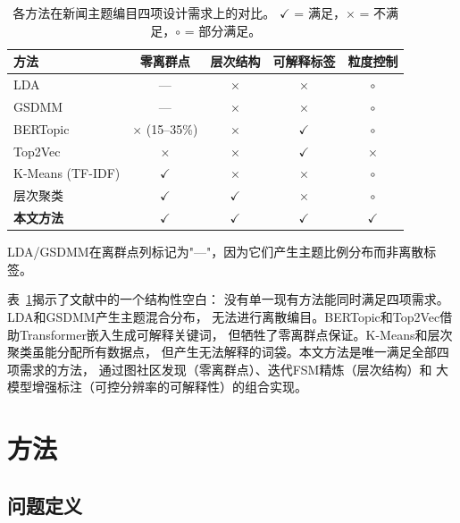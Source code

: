 \documentclass[10pt,twocolumn,twoside]{ctexart}
\begin{document}
\begin{table}[h]
\centering
\caption{各方法在新闻主题编目四项设计需求上的对比。
$\checkmark$ = 满足，$\times$ = 不满足，$\circ$ = 部分满足。}
\label{tab:method_requirement}
\small
\renewcommand{\arraystretch}{1.2}
\begin{tabular}{p{3.2cm}cccc}
\toprule
\textbf{方法} & \textbf{零离群点} & \textbf{层次结构} & \textbf{可解释标签} & \textbf{粒度控制} \\
\midrule
LDA~\cite{blei2003latent} 
    & --- & $\times$ & $\times$ & $\circ$ \\
GSDMM~\cite{yin2014gsdmm} 
    & --- & $\times$ & $\times$ & $\circ$ \\
BERTopic~\cite{grootendorst2022bertopic} 
    & $\times$ (15--35\%) & $\times$ & $\checkmark$ & $\circ$ \\
Top2Vec~\cite{angelov2020} 
    & $\times$ & $\times$ & $\checkmark$ & $\times$ \\
K-Means (TF-IDF) 
    & $\checkmark$ & $\times$ & $\times$ & $\circ$ \\
层次聚类
    & $\checkmark$ & $\checkmark$ & $\times$ & $\circ$ \\
\midrule
\textbf{本文方法} 
    & \textbf{$\checkmark$} & \textbf{$\checkmark$} & \textbf{$\checkmark$} & \textbf{$\checkmark$} \\
\bottomrule
\end{tabular}
\vspace{4pt}
\par\small
{\footnotesize LDA/GSDMM在离群点列标记为"---"，因为它们产生主题比例分布而非离散标签。}
\end{table}

表~\ref{tab:method_requirement}揭示了文献中的一个结构性空白：
没有单一现有方法能同时满足四项需求。LDA和GSDMM产生主题混合分布，
无法进行离散编目。BERTopic和Top2Vec借助Transformer嵌入生成可解释关键词，
但牺牲了零离群点保证。K-Means和层次聚类虽能分配所有数据点，
但产生无法解释的词袋。本文方法是唯一满足全部四项需求的方法，
通过图社区发现（零离群点）、迭代FSM精炼（层次结构）和
大模型增强标注（可控分辨率的可解释性）的组合实现。

\section{方法}

\subsection{问题定义}
\end{document}
